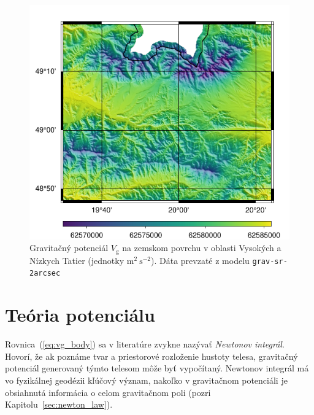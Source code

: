 \documentclass[a4paper, 12pt]{book}
\newcommand{\gidx}{\mathrm g}
\begin{document}
\begin{figure}
\centering
\includegraphics{./fig-vg-grav-sr-2arcsec.pdf}
\caption{Gravitačný potenciál $V_\gidx$ na zemskom povrchu v oblasti Vysokých 
a Nízkych Tatier (jednotky $\mathrm{m}^2 \ \mathrm{s}^{-2}$).  Dáta prevzaté 
z modelu \texttt{grav-sr-2arcsec} \citep{GravSR2arcsec}}
\label{fig:vg_grav_sr_2arcsec}
\end{figure}






\section{Teória potenciálu}
\label{sec:potential_theory}

Rovnica~(\ref{eq:vg_body}) sa v literatúre zvykne nazývať \emph{Newtonov 
integrál}.  Hovorí, že ak poznáme tvar a priestorové rozloženie hustoty telesa, 
gravitačný potenciál generovaný týmto telesom môže byť vypočítaný.  Newtonov 
integrál má vo fyzikálnej geodézii kľúčový význam, nakoľko v gravitačnom 
potenciáli je obsiahnutá informácia o celom gravitačnom poli (pozri 
Kapitolu~\ref{sec:newton_law}).
\end{document}
